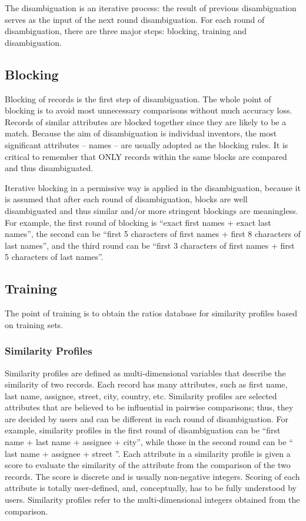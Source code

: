 \documentclass{article}
\begin{document}
The disambiguation is an iterative process: 
the result of previous disambiguation serves as the input of
the next round disambiguation. For each round of disambiguation, 
there are three major steps: blocking, training and disambiguation.

\subsection{Blocking}

Blocking of records is the first step of disambiguation. 
The whole point of blocking is to avoid most
unnecessary comparisons without much accuracy loss. Records 
of similar attributes are blocked
together since they are likely to be a match. Because the 
aim of disambiguation is individual inventors,
the most significant attributes – names – are 
usually adopted as the blocking rules. It is critical to
remember that ONLY records within the same blocks are 
compared and thus disambiguated.


Iterative blocking in a permissive way is applied in the 
disambiguation, because it is assumed that after each round 
of disambiguation, blocks are well disambiguated and thus 
similar and/or more stringent blockings are meaningless. 
For example, the first round of blocking is “exact 
first names + exact last names”, the second can 
be “first 5 characters of first names + first 8 characters 
of last names”, and the third round can be “first 
3 characters of first names + first 5 characters of last names”.


\subsection{Training}

The point of training is to obtain the ratios database for 
similarity profiles based on training sets.

\subsubsection{Similarity Profiles}

Similarity profiles are defined as multi-dimensional variables 
that describe the similarity of two records. Each record has 
many attributes, such as first name, last name, assignee, street, 
city, country, etc. Similarity profiles are selected attributes 
that are believed to be influential in pairwise comparisons; thus, 
they are decided by users and can be different in each round of 
disambiguation. For example, similarity profiles in the first round 
of disambiguation can be “first name + last name + assignee + 
city”, while those in the second round can be “ last name + 
assignee + street ”. Each attribute in a similarity profile is 
given a score to evaluate the similarity of the attribute from the
comparison of the two records. The score is discrete and is usually 
non-negative integers. Scoring of each attribute is totally 
user-defined, and, conceptually, has to be fully understood by users.
Similarity profiles refer to the multi-dimensional integers obtained 
from the comparison.
\end{document}
